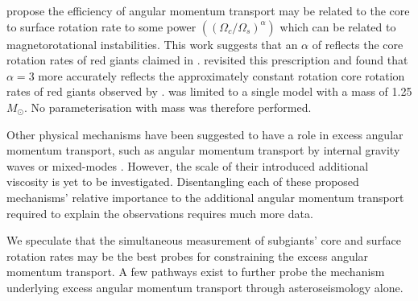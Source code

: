 \citet{spada_angular_2016} propose the efficiency of angular momentum transport may be related to the core to surface rotation rate to some power $\left(\left(\Omega_c/\Omega_s\right)^{\alpha}\right)$ which can be related to magnetorotational instabilities.
This work suggests that an $\alpha$ of reflects the core rotation rates of red giants claimed in \citet{mosser_spin_2012}.
\citet{moyano_asteroseismology_2022} revisited this prescription and found that $\alpha = 3$ more accurately reflects the approximately constant rotation core rotation rates of red giants observed by \citet{gehan_core_2018}.
\citet{spada_angular_2016} was limited to a single model with a mass of 1.25 $M_{\odot}$.
No parameterisation with mass was therefore performed.

Other physical mechanisms have been suggested to have a role in excess angular momentum transport, such as angular momentum transport by internal gravity waves \citep{pincon_can_2017} or mixed-modes \citep{belkacem_angular_2015}. 
However, the scale of their introduced additional viscosity is yet to be investigated.
Disentangling each of these proposed mechanisms' relative importance to the additional angular momentum transport required to explain the observations requires much more data.



We speculate that the simultaneous measurement of subgiants' core and surface rotation rates may be the best probes for constraining the excess angular momentum transport.
A few pathways exist to further probe the mechanism underlying excess angular momentum transport through asteroseismology alone.

